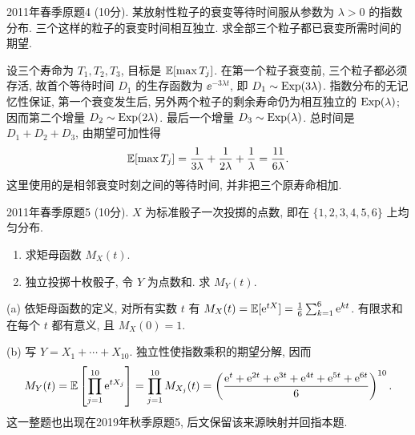 \begin{exercise}\label{m2:2011s:q4}\label{m2:2011s:q4:whole}
2011年春季原题4 (10分). 某放射性粒子的衰变等待时间服从参数为 $\lambda>0$ 的指数分布. 三个这样的粒子的衰变时间相互独立. 求全部三个粒子都已衰变所需时间的期望.
\end{exercise}
\begin{solution}
设三个寿命为 $T_1,T_2,T_3$, 目标是 $\mathbb E[\max T_j]$. 在第一个粒子衰变前, 三个粒子都必须存活, 故首个等待时间 $D_1$ 的生存函数为 $\ee^{-3\lambda t}$, 即 $D_1\sim\operatorname{Exp}(3\lambda)$. 指数分布的无记忆性保证, 第一个衰变发生后, 另外两个粒子的剩余寿命仍为相互独立的 $\operatorname{Exp}(\lambda)$; 因而第二个增量 $D_2\sim\operatorname{Exp}(2\lambda)$. 最后一个增量 $D_3\sim\operatorname{Exp}(\lambda)$. 总时间是 $D_1+D_2+D_3$, 由期望可加性得
\[
\mathbb E[\max T_j]=\frac1{3\lambda}+\frac1{2\lambda}+\frac1\lambda=\frac{11}{6\lambda}.
\]
这里使用的是相邻衰变时刻之间的等待时间, 并非把三个原寿命相加.
\end{solution}

\begin{exercise}\label{m2:2011s:q5}
2011年春季原题5 (10分). $X$ 为标准骰子一次投掷的点数, 即在 $\{1,2,3,4,5,6\}$ 上均匀分布.
\begin{enumerate}
\item[(a)]\label{m2:2011s:q5:a} 求矩母函数 $M_X(t)$.
\item[(b)]\label{m2:2011s:q5:b} 独立投掷十枚骰子, 令 $Y$ 为点数和. 求 $M_Y(t)$.
\end{enumerate}
\end{exercise}
\begin{solution}
(a) 依矩母函数的定义, 对所有实数 $t$ 有 $M_X(t)=\mathbb E[\mathrm e^{tX}]=\frac16\sum_{k=1}^6\mathrm e^{kt}$. 有限求和在每个 $t$ 都有意义, 且 $M_X(0)=1$.

(b) 写 $Y=X_1+\cdots+X_{10}$. 独立性使指数乘积的期望分解, 因而
\[
M_Y(t)=\mathbb E\left[\prod_{j=1}^{10}\mathrm e^{tX_j}\right]=\prod_{j=1}^{10}M_{X_j}(t)=\left(\frac{\mathrm e^t+\mathrm e^{2t}+\mathrm e^{3t}+\mathrm e^{4t}+\mathrm e^{5t}+\mathrm e^{6t}}6\right)^{10}.
\]
这一整题也出现在2019年秋季原题5, 后文保留该来源映射并回指本题.
\end{solution}

